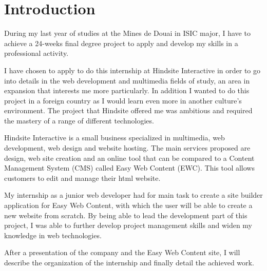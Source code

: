 \chapter{Introduction}

During my last year of studies at the Mines de Douai in ISIC major, I have to achieve a 24-weeks final degree project to
apply and develop my skills in a professional activity.

I have chosen to apply to do this internship at Hindsite Interactive in order to
go into details in the web development and multimedia fields of study, an area
in expansion that interests me more particularly. In addition I wanted to do this
project in a foreign country as I would learn even more in another culture's environment. The project that
Hindsite offered me was ambitious and required the mastery of a range of
different technologies.

Hindsite Interactive is a small business specialized in multimedia, web
development, web design and website hosting. The main services proposed
are design, web site creation and an online tool that can be compared to a
Content Management System (CMS) called Easy Web Content (EWC). This
tool allows customers to edit and manage their html website.

My internship as a junior web developer had for main task to create a site builder application for Easy Web Content, with which the user will be able to create a new website from scratch. By being able to lead the development part of this project, I was able to further develop project management skills and widen my knowledge in web technologies.

After a presentation of the company and the Easy Web Content site, I will
describe the organization of the internship and finally detail the achieved work.

\clearpage
